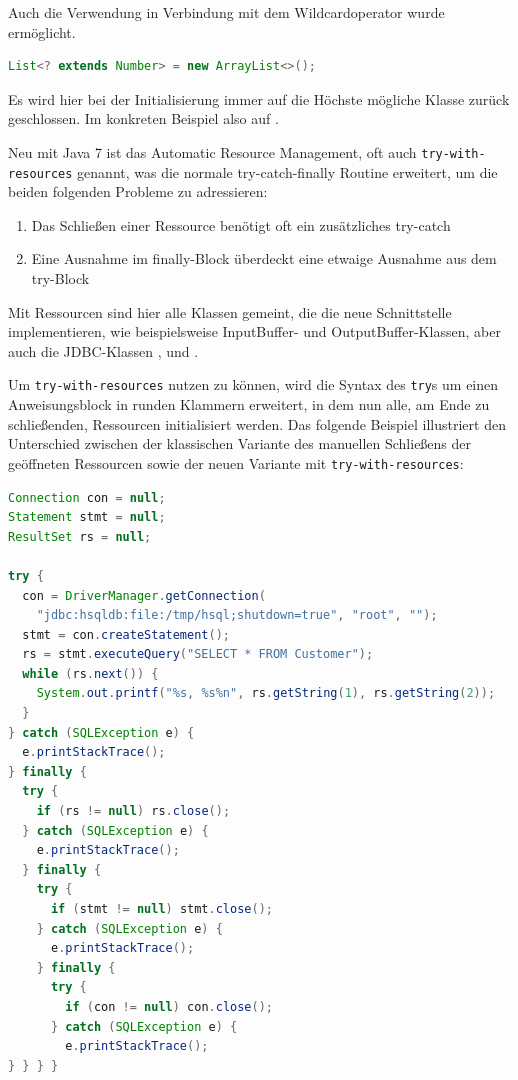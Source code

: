\documentclass[times, 10pt,twocolumn]{article}
\begin{document}
Auch die Verwendung in Verbindung mit dem Wildcardoperator wurde ermöglicht.
\begin{lstlisting}[language=java,breaklines=true]
  List<? extends Number> = new ArrayList<>();
\end{lstlisting}
Es wird hier bei der Initialisierung immer auf die Höchste mögliche Klasse zurück geschlossen. Im konkreten Beispiel also auf .\cite{v2bJava7}

\label{try_sec}
Neu mit Java 7 ist das Automatic Resource Management, oft auch \texttt{try-with-resources} genannt, was die normale try-catch-finally 
Routine erweitert, um die beiden folgenden Probleme zu adressieren:\cite{javainsel2}
\begin{enumerate}
\item Das Schließen einer Ressource benötigt oft ein zusätzliches try-catch
\item Eine Ausnahme im finally-Block überdeckt eine etwaige Ausnahme aus dem try-Block
\end{enumerate}

Mit Ressourcen sind hier alle Klassen gemeint, die die neue Schnittstelle  implementieren, wie beispielsweise
InputBuffer- und OutputBuffer-Klassen, aber auch die JDBC-Klassen ,  und .

Um \texttt{try-with-resources} nutzen zu können, wird die Syntax des \texttt{try}s um einen Anweisungsblock in runden Klammern erweitert,
in dem nun alle, am Ende zu schließenden, Ressourcen initialisiert werden. Das folgende Beispiel illustriert den Unterschied zwischen der
klassischen Variante des manuellen Schließens der geöffneten Ressourcen sowie der neuen Variante mit \texttt{try-with-resources}:

\begin{lstlisting}[language=java,breaklines=true]
Connection con = null;
Statement stmt = null;
ResultSet rs = null;

try {
  con = DriverManager.getConnection(
	"jdbc:hsqldb:file:/tmp/hsql;shutdown=true", "root", "");
  stmt = con.createStatement();
  rs = stmt.executeQuery("SELECT * FROM Customer");
  while (rs.next()) {
	System.out.printf("%s, %s%n", rs.getString(1), rs.getString(2));
  }
} catch (SQLException e) {
  e.printStackTrace();
} finally {
  try {
	if (rs != null) rs.close();
  } catch (SQLException e) {
	e.printStackTrace();
  } finally {
	try {
	  if (stmt != null)	stmt.close();
	} catch (SQLException e) {
	  e.printStackTrace();
	} finally {
	  try {
		if (con != null) con.close();
	  } catch (SQLException e) {
		e.printStackTrace();
} } } }
\end{lstlisting}
\end{document}
